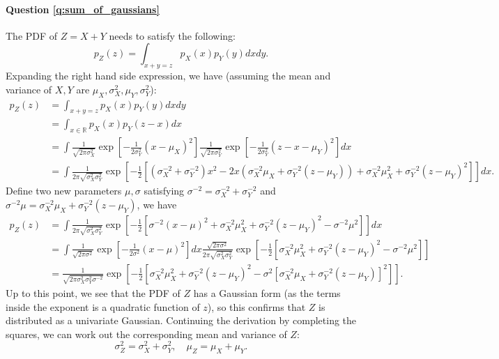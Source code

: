 \paragraph{Question \ref{q:sum_of_gaussians}}

The PDF of $Z = X + Y$ needs to satisfy the following:
$$p_Z(z) = \int_{x+y = z} p_X(x)p_Y(y) dx dy.$$
Expanding the right hand side expression, we have (assuming the mean and variance of $X, Y$ are $\mu_X, \sigma^2_X, \mu_Y, \sigma^2_Y$):
\begin{equation*}
\begin{aligned}
p_Z(z) &= \int_{x+y = z} p_X(x)p_Y(y) dx dy \\
&= \int_{x \in \mathbb{R}} p_X(x)p_Y(z - x) dx \\
&= \int \frac{1}{\sqrt{2\pi \sigma^2_X}} \exp[-\frac{1}{2\sigma^2_Y}(x - \mu_X)^2]  \frac{1}{\sqrt{2\pi \sigma^2_Y}} \exp[-\frac{1}{2\sigma^2_Y}(z - x - \mu_Y)^2] dx \\
&= \int \frac{1}{2 \pi \sqrt{\sigma^2_X \sigma^2_Y}} \exp[-\frac{1}{2}[ (\sigma_X^{-2} + \sigma_Y^{-2}) x^2 - 2 x (\sigma_X^{-2} \mu_X + \sigma_Y^{-2}(z - \mu_Y)) + \sigma_X^{-2} \mu_X^2 + \sigma_Y^{-2} (z - \mu_Y)^2 ]] dx.
\end{aligned}
\end{equation*}
Define two new parameters $\mu, \sigma$ satisfying $\sigma^{-2} = \sigma_X^{-2} + \sigma_Y^{-2}$ and $\sigma^{-2} \mu = \sigma_X^{-2} \mu_X + \sigma_Y^{-2}(z - \mu_Y)$, we have
\begin{equation*}
\begin{aligned}
p_Z(z) &= \int \frac{1}{2 \pi \sqrt{\sigma^2_X \sigma^2_Y}} \exp[-\frac{1}{2}[ \sigma^{-2} (x - \mu)^2 + \sigma_X^{-2} \mu_X^2 + \sigma_Y^{-2} (z - \mu_Y)^2 - \sigma^{-2} \mu^2 ]] dx \\
&= \int \frac{1}{\sqrt{2 \pi \sigma^2}} \exp[-\frac{1}{2 \sigma^2} (x - \mu)^2] dx \frac{\sqrt{2 \pi \sigma^2}}{2 \pi \sqrt{\sigma^2_X \sigma^2_Y}} \exp[-\frac{1}{2}[ \sigma_X^{-2} \mu_X^2 + \sigma_Y^{-2} (z - \mu_Y)^2 - \sigma^{-2} \mu^2 ]] \\
&= \frac{1}{\sqrt{2 \pi \sigma^2_X \sigma^2_Y \sigma^{-2}}} \exp[-\frac{1}{2}[ \sigma_X^{-2} \mu_X^2 + \sigma_Y^{-2} (z - \mu_Y)^2 - \sigma^2 [\sigma_X^{-2} \mu_X + \sigma_Y^{-2}(z - \mu_Y)]^2 ]]. 
\end{aligned}
\end{equation*}
Up to this point, we see that the PDF of $Z$ has a Gaussian form (as the terms inside the exponent is a quadratic function of $z$), so this confirms that $Z$ is distributed as a univariate Gaussian. Continuing the derivation by completing the squares, we can work out the corresponding mean and variance of $Z$:
$$\sigma_Z^2 = \sigma_X^2 + \sigma_Y^2, \quad \mu_Z = \mu_X + \mu_Y.$$


